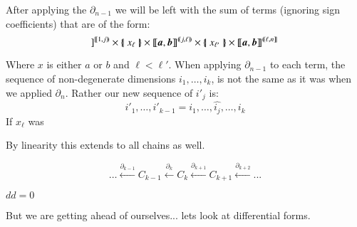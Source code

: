 After applying the $\partial_{n-1}$ we will be left with the sum of terms (ignoring sign coefficients) that are of the form:
\begin{equation}
	[\![\boldsymbol{a}, \boldsymbol{b}]\!]^{[\![1,j)\!)}
		\times
	\hset{x_\ell}
		\times
	[\![\boldsymbol{a}, \boldsymbol{b}]\!]^{(\!(j,\ell)\!)}
		\times
	\hset{x_{\ell'}}
		\times
	[\![\boldsymbol{a}, \boldsymbol{b}]\!]^{(\!(\ell,n]\!]}
\end{equation}

Where $x$ is either $a$ or $b$ and $\ell < \ell'$.
When applying $\partial_{n-1}$ to each term, the sequence of non-degenerate dimensions $i_1, \ldots, i_k$, 
is not the same as it was when we applied $\partial_n$.
Rather our new sequence of $i'_j$ is:
\begin{equation}
	i'_1 , \ldots, i'_{k-1} = i_1, \ldots, \widehat{i_j}, \ldots, i_k
\end{equation}
If $x_\ell$ was 

By linearity this extends to all chains as well. 





\begin{equation}
	\ldots \xleftarrow{\partial_{k-1}} C_{k-1} \xleftarrow{\partial_{k}} C_k \xleftarrow{\partial_{k+1}} C_{k+1} \xleftarrow{\partial_{k+2}} ...
\end{equation}

$dd=0$

But we are getting ahead of ourselves... lets look at differential forms.